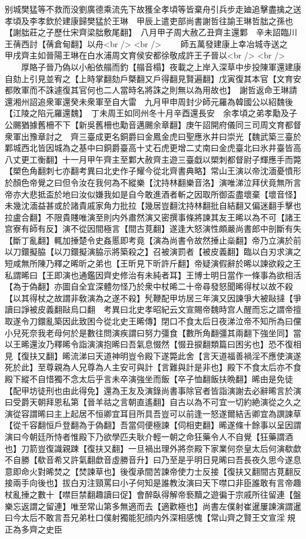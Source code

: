 别城樊猛等不救而没劉廣德乘流先下故獲全孝頃等皆棄舟引兵步走廸追擊盡擒之送孝頃及李孝欽於建康歸樊猛於王琳　甲辰上遣吏部尚書謝哲往諭王琳哲朏之孫也【謝朏莊之子歷仕宋齊梁朏敷尾翻】　八月甲子周大赦乙丑齊主還鄴　辛未詔臨川王蒨西討【蒨倉甸翻】以舟<br />
<br />
　　師五萬發建康上幸冶城寺送之　甲戌齊主如晉陽王琳在白水浦周文育侯安都徐敬成許王子晉以<br />
<br />
　　厚賂子晉乃偽以小船依䑽而釣【䑽音榻】夜載之上岸入深草中步投陳軍還建康自劾上引見並宥之【上時掌翻劾戶槩翻又戶得翻見賢遍翻】戊寅復其本官【文育安都敗軍而不誅遽復其官何也二人當時名將誅之則無以為用故也】　謝哲返命王琳請還湘州詔追衆軍還癸未衆軍至自大雷　九月甲申周封少師元羅為韓國公以紹魏後【江陵之陷元羅還魏】　丁未周王如同州冬十月辛酉還長安　余孝頃之弟孝勱及子公颺猶據舊柵不下【新吳舊柵也勱音邁颺余章翻】庚午詔開府儀同三司周文育都督衆軍出豫章討之　齊三臺成更名銅爵曰金鳳金虎曰聖應氷井曰崇光【魏武築三臺於鄴城西北皆因城為之基中曰銅爵臺高十丈石虎更增二丈南曰金虎臺北曰氷井臺皆高八丈更工衡翻】十一月甲午齊主至鄴大赦齊主遊三臺戱以槊刺都督尉子輝應手而斃【槊色角翻刺七亦翻考異曰北史作子耀今從北齊書典略】常山王演以帝沈湎憂憤形於顏色帝覺之曰但令汝在我何為不縱樂【沈持林翻樂音洛】演唯涕泣拜伏竟無所言帝亦大悲抵盃於地曰汝似嫌我如是自今敢進酒者斬之因取所御盃盡壞棄【壞音怪】未幾沈湎益甚或於諸貴戚家角力批拉【幾居豈翻沈持林翻批自結翻又偏迷翻手擊也拉盧合翻】不限貴賤唯演至則内外肅然演又密撰事條將諫其友王晞以為不可【諸王宫寮有師有反】演不從因間極言【間古莧翻】遂逢大怒演性頗嚴尚書郎中剖斷有失【斷丁亂翻】輒加捶楚令史姦慝即考竟【演為尚書令故然捶止橤翻】帝乃立演於前以刀鐶擬脇【以刀鐶擬演脇示將築殺之】召被演罰者【被皮義翻】臨以白刃求演之短咸無所陳乃釋之晞昕之弟也【王昕見下昕許斤翻】帝疑演假辭於晞以諫欲殺之王私謂晞曰【王即演也通鑑因齊史修治有未純者耳】王博士明日當作一條事為欲相活【為于偽翻】亦圖自全宜深體勿怪乃於衆中杖晞二十帝尋發怒聞晞得杖以故不殺【以其得杖之故謂非敎演為之遂不殺】髠鞭配甲坊居三年演又因諫爭大被敺撻【爭讀曰諍被皮義翻敺烏口翻　考異曰北史孝昭紀云文宣賜帝魏時宫人醒而忘之謂帝擅取遂令刀鐶亂築因此致困今從北史王晞傳】閉口不食太后日夜涕泣帝不知所為曰儻小兒死奈我老母何於是數往問演疾謂曰努力彊食【數所角翻彊其兩翻下強坐同】當以王晞還汝乃釋晞令詣演演抱晞曰吾氣息惙然【惙丑捩翻類篇曰困劣也】恐不復相見【復扶又翻】晞流涕曰天道神明豈令殿下遂斃此舍【言天道福善禍淫不應使演遂死於此】至尊親為人兄尊為人主安可與計【言難與計是非也】殿下不食太后亦不食殿下縱不自惜獨不念太后乎言未卒演強坐而飯【卒子恤翻飯扶晩翻】晞由是免徒【配甲坊徒刑也由此得免】還為王友及演錄尚書事除官者皆詣演謝去必辭晞言於演曰受爵天朝拜恩私第【晉羊祜之言朝直遙翻】自古以為不可宜一切約絶演從之久之演從容謂晞曰主上起居不恒卿宜耳目所具吾豈可以前逢一怒遂爾結舌卿宜為譔諫草【從千容翻恒戶登翻為于偽翻】吾當伺便極諫【伺相吏翻】晞遂條十餘事以呈因謂演曰今朝廷所恃者惟殿下乃欲學匹夫耿介輕一朝之命狂藥令人不自覺【狂藥謂酒也】刀箭豈復識親踈【復扶又翻】一旦禍出理外將奈殿下家業何奈皇太后何演欷歔不自勝【欷音希又許氣翻歔音虛勝音升】曰乃至是乎明日見晞曰吾長夜久思今遂息意即命火對晞焚之【焚諫草也】後復承間苦諫帝使力士反接【復扶又翻間古莧翻反接兩手向後也】拔白刃注頸罵曰小子何知是誰教汝演曰天下噤口非臣誰敢有言帝趣杖亂捶之數十【噤巨禁翻趣讀曰促】會醉臥得解帝䙝黷之遊徧于宗戚所往留連【盤樂忘返謂之留連】唯至常山第多無適而去【適歡極也】尚書左僕射崔暹屢諫演謂暹曰今太后不敢言吾兄弟杜口僕射獨能犯顔内外深相感愧【常山齊之賢王文宣淫規正為多齊之史臣
